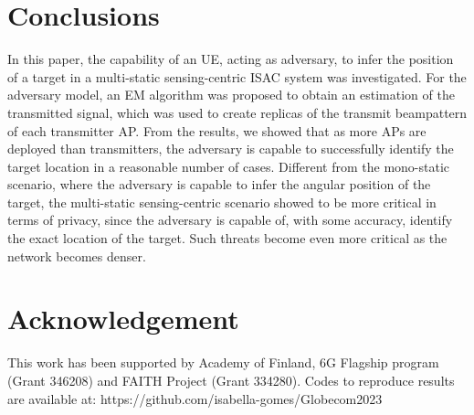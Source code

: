 \documentclass[conference,twocolumn,a4paper]{IEEEtran}
\theoremstyle{remark} \newtheorem{remark}{Remark}
\begin{document}
\section{Conclusions}
In this paper, the capability of an UE, acting as adversary, to infer the position of a target in a multi-static sensing-centric ISAC system was investigated. For the adversary model, an EM algorithm was proposed to obtain an estimation of the transmitted signal, which was used to create replicas of the transmit beampattern of each transmitter AP. From the results, we showed that as more APs are deployed than transmitters, the adversary is capable to successfully identify the target location in a reasonable number of cases. Different from the mono-static scenario, where the adversary is capable to infer the angular position of the target, the multi-static sensing-centric scenario showed to be more critical in terms of privacy, since the adversary is capable of, with some accuracy, identify the exact location of the target. Such threats become even more critical as the network becomes denser.  


\section*{Acknowledgement}
This work has been supported by Academy of Finland, 6G Flagship program (Grant 346208) and FAITH Project (Grant 334280). Codes to reproduce results are available at: https://github.com/isabella-gomes/Globecom2023


\end{document}
